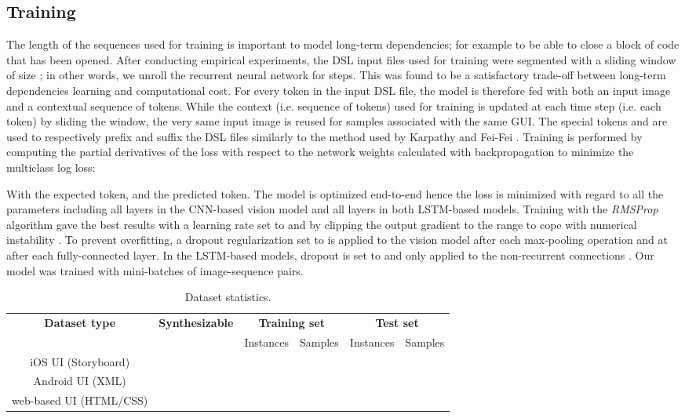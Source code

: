 \documentclass{article}
\begin{document}
\subsection{Training}

The length  of the sequences used for training is important to model long-term dependencies; for example to be able to close a block of code that has been opened. After conducting empirical experiments, the DSL input files used for training were segmented with a sliding window of size ; in other words, we unroll the recurrent neural network for  steps. This was found to be a satisfactory trade-off between long-term dependencies learning and computational cost. For every token in the input DSL file, the model is therefore fed with both an input image and a contextual sequence of  tokens. While the context (i.e. sequence of tokens) used for training is updated at each time step (i.e. each token) by sliding the window, the very same input image  is reused for samples associated with the same GUI. The special tokens  and  are used to respectively prefix and suffix the DSL files similarly to the method used by Karpathy and Fei-Fei \cite{karpathy2015deep}. Training is performed by computing the partial derivatives of the loss with respect to the network weights calculated with backpropagation to minimize the multiclass log loss:



With  the expected token, and  the predicted token. The model is optimized end-to-end hence the loss  is minimized with regard to all the parameters including all layers in the CNN-based vision model and all layers in both LSTM-based models. Training with the \emph{RMSProp} algorithm \cite{tieleman2012lecture} gave the best results with a learning rate set to  and by clipping the output gradient to the range  to cope with numerical instability \cite{graves2013generating}. To prevent overfitting, a dropout regularization \cite{srivastava2014dropout} set to  is applied to the vision model after each max-pooling operation and at  after each fully-connected layer. In the LSTM-based models, dropout is set to  and only applied to the non-recurrent connections \cite{zaremba2014recurrent}. Our model was trained with mini-batches of  image-sequence pairs.

\begin{table}[H]
    \caption{Dataset statistics.}
    \centering
    \begin{tabular}{| c | c | c | c | c | c |} \hline
        \multirow{2}{*}{\textbf{Dataset type}} &
        \multirow{2}{*}{\textbf{Synthesizable}} &
        \multicolumn{2}{c|}{\textbf{Training set}} & \multicolumn{2}{c|}{\textbf{Test set}} \\ \cline{3-6}
        & & Instances & Samples & Instances & Samples \\ \hline
        iOS UI (Storyboard) &  &  &  &  &  \\ \hline
        Android UI (XML) &  &  &  &  &  \\ \hline
        web-based UI (HTML/CSS) &  &  &  &  &  \\ \hline
    \end{tabular}
    \label{tab:dataset}
\end{table}
\end{document}
